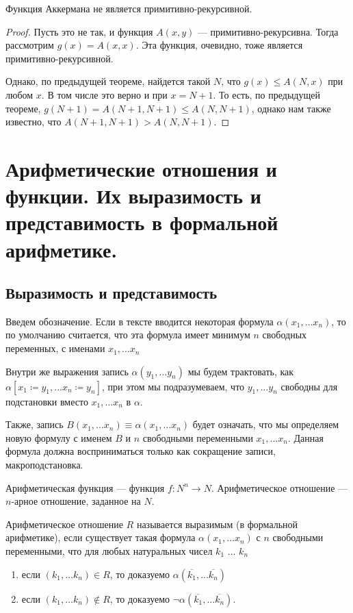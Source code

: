 \begin{theorem}
Функция Аккермана не является примитивно-рекурсивной.
\end{theorem}

\begin{proof}
Пусть это не так, и функция $A(x,y)$ --- примитивно-рекурсивна.
Тогда рассмотрим $g(x) = A(x,x)$. Эта функция, очевидно, тоже является 
примитивно-рекурсивной. 

Однако, по предыдущей теореме, найдется такой $N$, что $g(x) \le A(N,x)$
при любом $x$. В том числе это верно и при $x=N+1$.
То есть, по предыдущей теореме, $g(N+1) = A(N+1,N+1) \le A(N,N+1)$, 
однако нам также известно, что $A(N+1,N+1) > A(N,N+1)$.
\end{proof}

\section{Арифметические отношения и функции. Их выразимость и представимость в формальной арифметике.}

\subsection{Выразимость и представимость}

Введем обозначение. Если в тексте вводится некоторая формула $\alpha(x_1, \dots x_n)$, то
по умолчанию считается, что эта формула имеет минимум $n$ свободных переменных, с именами
$x_1, \dots x_n$

Внутри же выражения запись $\alpha (y_1, \dots y_n)$ мы будем трактовать, как 
$\alpha [x_1 \coloneqq  y_1, ... x_n \coloneqq  y_n]$, при этом
мы подразумеваем, что $y_1, \dots y_n$ свободны для подстановки вместо $x_1, \dots x_n$ в $\alpha$.

Также, запись $B(x_1, \dots x_n) \equiv \alpha(x_1, \dots x_n)$ будет означать, что мы определяем
новую формулу с именем $B$ и $n$ свободными переменными $x_1, \dots x_n$. 
Данная формула должна восприниматься только как сокращение записи, макроподстановка.

\begin{definition}
Арифметическая функция --- функция $f: N^n \rightarrow N$.
Арифметическое отношение --- $n$-арное отношение, заданное на $N$.
\end{definition}

\begin{definition}
Арифметическое отношение $R$ называется выразимым (в формальной арифметике), если 
существует такая формула $\alpha (x_1, \dots x_n)$ с $n$ свободными переменными, 
что для любых натуральных чисел $k_1$ ... $k_n$
\begin{enumerate}
\item если $(k_1, \dots k_n) \in R$, то доказуемо $\alpha (\overline{k_1}, \dots \overline{k_n})$
\item если $(k_1, \dots k_n) \notin R $, то доказуемо $\neg \alpha (\overline{k_1}, \dots \overline{k_n})$.
\end{enumerate}
\end{definition}

